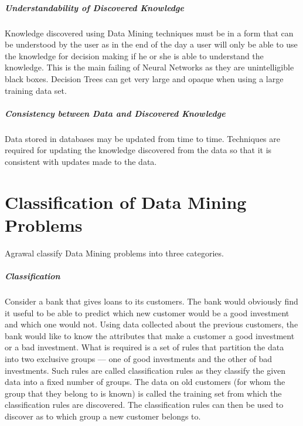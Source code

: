 \documentclass[a4paper,12pt,notitlepage,pdftex]{scrreprt}
\begin{document}
    \paragraph{Understandability of Discovered Knowledge}
        Knowledge discovered using Data Mining techniques must be in a form that can be understood by the user as in
        the end of the day a user will only be able to use the knowledge for decision making if he or she is able to
        understand the knowledge.
        This is the main failing of Neural Networks as they are unintelligible black boxes.
        Decision Trees can get very large and opaque when using a large training data set.
    \paragraph{Consistency between Data and Discovered Knowledge}
        Data stored in databases may be updated from time to time.
        Techniques are required for updating the knowledge discovered from the data so that it is consistent with
        updates made to the data.

\chapter{Classification of Data Mining Problems}
    Agrawal classify Data Mining problems into three categories.

    \paragraph{Classification}
        Consider a bank that gives loans to its customers.
        The bank would obviously find it useful to be able to predict which new customer would be a good investment
        and which one would not.
        Using data collected about the previous customers, the bank would like to know the attributes that make a
        customer a good investment or a bad investment.
        What is required is a set of rules that partition the data into two exclusive groups --- one of good
        investments and the other of bad investments.
        Such rules are called classification rules as they classify the given data into a fixed number of groups.
        The data on old customers (for whom the group that they belong to is known) is called the training set from
        which the classification rules are discovered.
        The classification rules can then be used to discover as to which group a new customer belongs to.
\end{document}
